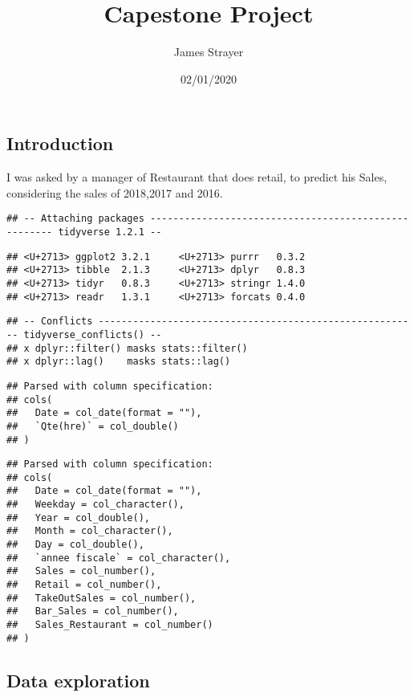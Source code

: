 \documentclass[
]{article}
\title{Capestone Project}
\author{James Strayer}
\date{02/01/2020}
\begin{document}
\maketitle

\hypertarget{introduction}{%
\subsection{Introduction}\label{introduction}}

I was asked by a manager of Restaurant that does retail, to predict his
Sales, considering the sales of 2018,2017 and 2016.

\begin{verbatim}
## -- Attaching packages ----------------------------------------------------- tidyverse 1.2.1 --
\end{verbatim}

\begin{verbatim}
## <U+2713> ggplot2 3.2.1     <U+2713> purrr   0.3.2
## <U+2713> tibble  2.1.3     <U+2713> dplyr   0.8.3
## <U+2713> tidyr   0.8.3     <U+2713> stringr 1.4.0
## <U+2713> readr   1.3.1     <U+2713> forcats 0.4.0
\end{verbatim}

\begin{verbatim}
## -- Conflicts -------------------------------------------------------- tidyverse_conflicts() --
## x dplyr::filter() masks stats::filter()
## x dplyr::lag()    masks stats::lag()
\end{verbatim}

\begin{verbatim}
## Parsed with column specification:
## cols(
##   Date = col_date(format = ""),
##   `Qte(hre)` = col_double()
## )
\end{verbatim}

\begin{verbatim}
## Parsed with column specification:
## cols(
##   Date = col_date(format = ""),
##   Weekday = col_character(),
##   Year = col_double(),
##   Month = col_character(),
##   Day = col_double(),
##   `annee fiscale` = col_character(),
##   Sales = col_number(),
##   Retail = col_number(),
##   TakeOutSales = col_number(),
##   Bar_Sales = col_number(),
##   Sales_Restaurant = col_number()
## )
\end{verbatim}

\hypertarget{data-exploration}{%
\subsection{Data exploration}\label{data-exploration}}
\end{document}
